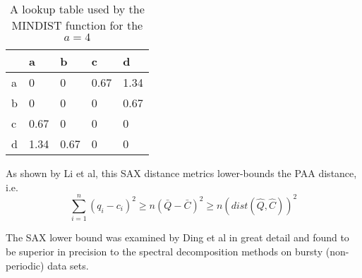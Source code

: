 \begin{table}
\begin{tabularx}{400pt}{X X X X X}
\hline
   & a   & b    & c    & d    \\
\hline
a & 0    & 0    & 0.67 & 1.34 \\
b & 0    & 0    & 0    & 0.67 \\
c & 0.67 & 0    & 0    & 0    \\
d & 1.34 & 0.67 & 0    & 0    \\
\hline
\end{tabularx}
\caption{A lookup table used by the MINDIST function for the $a=4$}
\label{tbl:sax_lookup}
\end{table}

As shown by Li et al, this SAX distance metrics lower-bounds the PAA distance, i.e.
\begin{equation}
\sum_{i=1}^{n} (q_{i} - c_{i})^{2} \geq n(\bar{Q} - \bar{C})^{2} \geq n(dist(\hat{Q},\hat{C}))^2
\label{eq:sax_bounding}
\end{equation}

The SAX lower bound was examined by Ding et al \cite{citeulike:4501572} in great detail and found to be superior in precision to the spectral decomposition methods on bursty (non-periodic) data sets.

